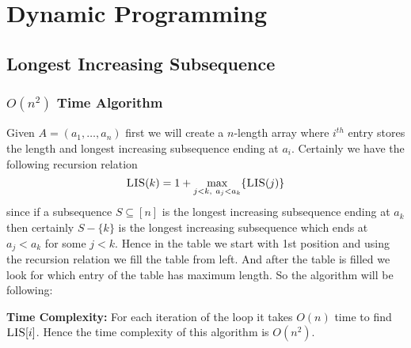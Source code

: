 \chapter{Dynamic Programming}
\section{Longest Increasing Subsequence}
\begin{algoprob}
\end{algoprob}
\subsection{$O(n^2)$ Time Algorithm}
Given $A=(a_1,\dots, a_n)$ first we will create a $n$-length array where $i^{th}$ entry stores the length and longest increasing subsequence ending at $a_i$. Certainly we have the following recursion relation$$\textsc{LIS}(k)=1+\max\limits_{\substack{j<k,\  a_j<a_k}}\{\textsc{LIS}(j)\}$$since if a subsequence $S\subseteq [n]$ is the longest increasing subsequence ending at $a_k$ then certainly $S-\{k\}$ is the longest increasing subsequence which ends at $a_j<a_k$ for some $j<k$. Hence in the table we start with 1st position and using the recursion relation we fill the table from left. And after the table is filled we look for which entry of the table has maximum length. So the algorithm will be following:

\begin{algorithm}[H]
	\DontPrintSemicolon
\caption{$(A)$}
\end{algorithm}\parinf
\textbf{Time Complexity:} For each iteration of the loop it takes $O(n)$ time to find $\textsc{LIS}[i]$. Hence the time complexity of this algorithm is $O(n^2)$. \parinn
